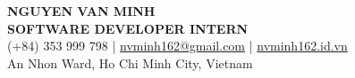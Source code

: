 \begin{center}
    {\fontsize{25}{28}\selectfont\bfseries NGUYEN VAN MINH}\\[4pt]
    {\large\bfseries SOFTWARE DEVELOPER INTERN}\\[6pt]
    (+84) 353 999 798 \;|\; \href{mailto:nvminh162@gmail.com}{nvminh162@gmail.com} \;|\; \href{https://nvminh162.id.vn}{nvminh162.id.vn}\\[3pt]
    An Nhon Ward, Ho Chi Minh City, Vietnam
    \\ \vspace{-1pt}
\end{center}
